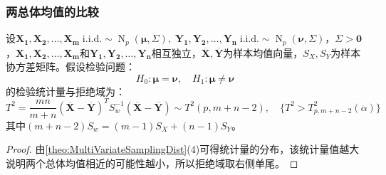 \subsubsection{两总体均值的比较}
\begin{theorem}
	设$\mathbf{X_1},\mathbf{X_2},\dots,\mathbf{X_m}\;\text{i.i.d.}\sim\operatorname{N}_p(\boldsymbol{\mu},\Sigma),\;\mathbf{Y_1},\mathbf{Y_2},\dots,\mathbf{Y_n}\;\text{i.i.d.}\sim\operatorname{N}_p(\boldsymbol{\nu},\Sigma)$，$\Sigma>\mathbf{0}$，$\mathbf{X_1},\mathbf{X_2},\dots,\mathbf{X_m}$和$\mathbf{Y_1},\mathbf{Y_2},\dots,\mathbf{Y_n}$相互独立，$\overline{\mathbf{X}},\overline{\mathbf{Y}}$为样本均值向量，$S_X,S_Y$为样本协方差矩阵。假设检验问题：
	\begin{equation*}
		H_0:\boldsymbol{\mu}=\boldsymbol{\nu},\quad H_1:\boldsymbol{\mu}\ne\boldsymbol{\nu}
	\end{equation*}
	的检验统计量与拒绝域为：
	\begin{equation*}
		T^2=\frac{mn}{m+n}(\overline{\mathbf{X}}-\overline{\mathbf{Y}})^TS_{w}^{-1}(\overline{\mathbf{X}}-\overline{\mathbf{Y}})\sim T^2(p,m+n-2),\quad\{T^2>T^2_{p,m+n-2}(\alpha)\}
	\end{equation*}
	其中$(m+n-2)S_w=(m-1)S_X+(n-1)S_Y$。
\end{theorem}
\begin{proof}
	由\cref{theo:MultiVariateSamplingDist}(4)可得统计量的分布，该统计量值越大说明两个总体均值相近的可能性越小，所以拒绝域取右侧单尾。
\end{proof}
